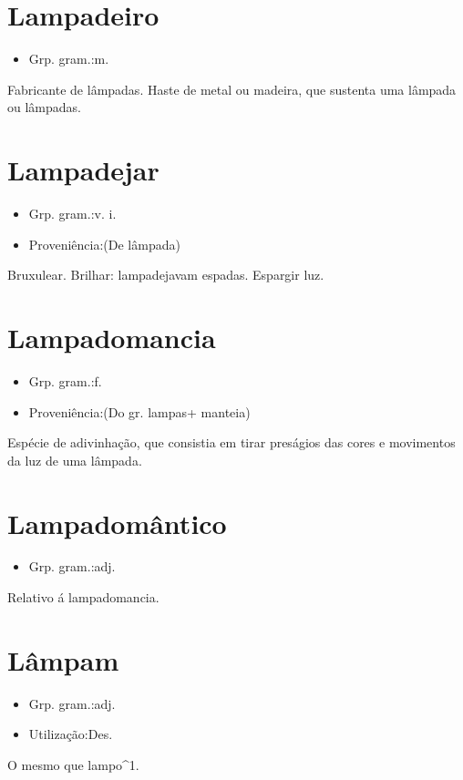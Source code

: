 \section{Lampadeiro}
\begin{itemize}
\item {Grp. gram.:m.}
\end{itemize}
Fabricante de lâmpadas.
Haste de metal ou madeira, que sustenta uma lâmpada ou lâmpadas.
\section{Lampadejar}
\begin{itemize}
\item {Grp. gram.:v. i.}
\end{itemize}
\begin{itemize}
\item {Proveniência:(De \textunderscore lâmpada\textunderscore )}
\end{itemize}
Bruxulear.
Brilhar: \textunderscore lampadejavam espadas\textunderscore .
Espargir luz.
\section{Lampadomancia}
\begin{itemize}
\item {Grp. gram.:f.}
\end{itemize}
\begin{itemize}
\item {Proveniência:(Do gr. \textunderscore lampas\textunderscore  + \textunderscore manteia\textunderscore )}
\end{itemize}
Espécie de adivinhação, que consistia em tirar preságios das cores e movimentos da luz de uma lâmpada.
\section{Lampadomântico}
\begin{itemize}
\item {Grp. gram.:adj.}
\end{itemize}
Relativo á lampadomancia.
\section{Lâmpam}
\begin{itemize}
\item {Grp. gram.:adj.}
\end{itemize}
\begin{itemize}
\item {Utilização:Des.}
\end{itemize}
O mesmo que \textunderscore lampo\textunderscore ^1.
